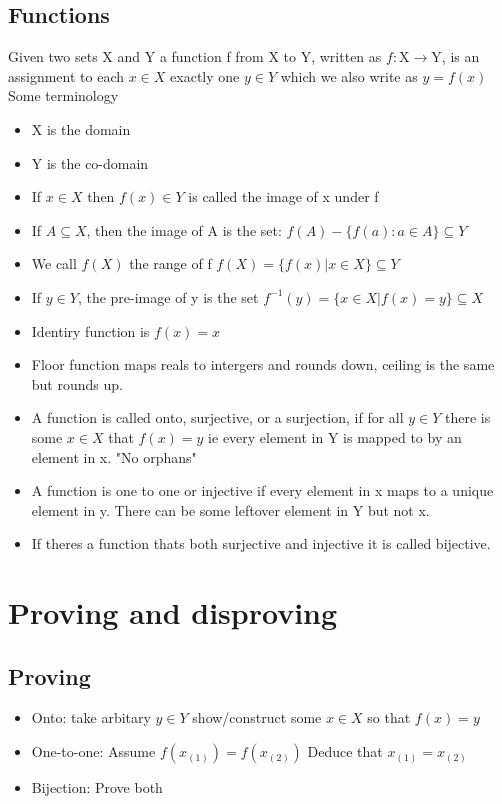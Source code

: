 \documentclass[a4paper, 11pt]{report}
\begin{document}
    \subsection{Functions}
    Given two sets X and Y a function f from X to Y, written as \(f: \mathrm{X}
    \rightarrow \mathrm{Y}\), is an assignment to each \(x \in X\) exactly one
    \(y \in Y\) which we also write as \(y = f(x)\) \\
    Some terminology \\
    \begin{itemize}
        \item X is the domain
        \item Y is the co-domain
        \item If \(x \in X\) then \(f(x) \in Y\) is called the image of x under
            f
        \item If \(A \subseteq X\), then the image of A is the set: \(f(A) -
            \{f(a) : a \in A \} \subseteq Y\)
        \item We call \(f(X)\) the range of f \(f(X) = \{f(x) | x \in X\}
            \subseteq Y\)
        \item If \(y \in Y\), the pre-image of y is the set \(f^{-1}(y) = \{x
            \in X | f(x) = y\} \subseteq X\)
        \item Identiry function is \(f(x) = x\)
        \item Floor function maps reals to intergers and rounds down, ceiling is
            the same but rounds up.
    \end{itemize}
    \begin{itemize}
        \item A function is called onto, surjective, or a surjection, if for all \(y \in Y\) there is some \(x \in X\) that \(f(x) = y\) ie every element in Y is mapped to by an element in x. "No orphans"
        \item A function is one to one or injective if every element in x maps to a unique element in y. There can be some leftover element in Y but not x.
        \item If theres a function thats both surjective and injective it is called bijective. 
    \end{itemize}
    \section{Proving and disproving}
    \subsection{Proving}
    \begin{itemize}
        \item Onto: take arbitary \(y \in Y\) show/construct some \(x \in X\) so that \(f(x) = y\)
        \item One-to-one: Assume \(f(x_(1)) = f(x_(2))\) Deduce that \(x_(1) = x_(2)\)
        \item Bijection: Prove both
    \end{itemize}
\end{document}
